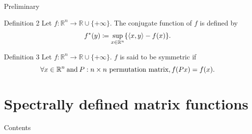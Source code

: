 \documentclass[aspectratio=169, dvipdfmx, 11pt]{beamer} %
\newcommand{\RealNumberSet}{\mathbb{R}}
\newcommand{\NDemenstionalRealEuclideanSpace}{\mathbb{R}^n}
\newcommand{\InnerProduct}[2]{\left\langle {#1},{#2}\right\rangle} %
\newcommand{\ExtendedRealValuedFunction}[2]{{#1}: {#2} \to \RealNumberSet \cup \{+\infty\}}
\newcommand{\ConjugateFunction}[1]{{#1}^*}
\begin{document}
\begin{frame}{Preliminary}
  \begin{block}{Definition 2}
    Let $\ExtendedRealValuedFunction{f}{\NDemenstionalRealEuclideanSpace}$.
    The conjugate function of $f$ is defined by
    \begin{equation}
      \ConjugateFunction{f}(y) \coloneqq \sup_{x \in \NDemenstionalRealEuclideanSpace} \{ \InnerProduct{x}{y} - f(x) \}. \notag
    \end{equation}
  \end{block}

  \begin{block}{Definition 3}
    Let $\ExtendedRealValuedFunction{f}{\NDemenstionalRealEuclideanSpace}$.
    $f$ is said to be symmetric if
    \begin{equation}
      \forall x \in \NDemenstionalRealEuclideanSpace \:\text{and}\: P: n \times n \text{ permutation matrix}, f(Px) = f(x). \notag
    \end{equation}
  \end{block}
\end{frame}

\section{Spectrally defined matrix functions}
\begin{frame}{Contents}
  \tableofcontents[currentsection]
\end{frame}
\end{document}
